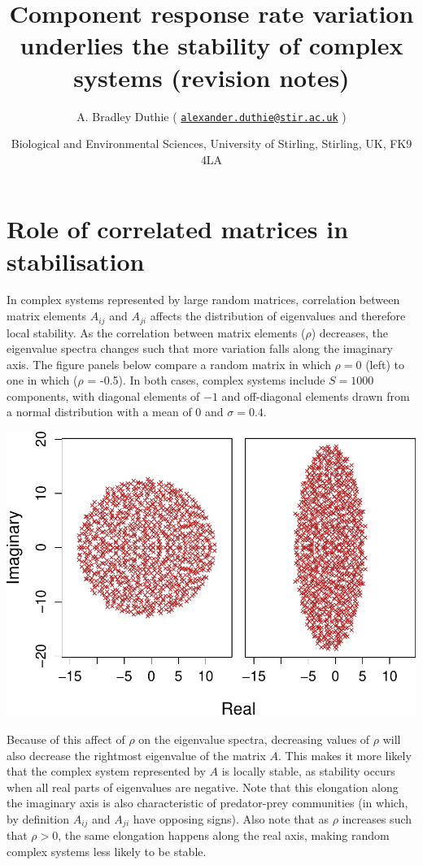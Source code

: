 \documentclass[]{article}
\title{Component response rate variation underlies the stability of complex
systems (revision notes)}
\author{A. Bradley Duthie (
\href{mailto:alexander.duthie@stir.ac.uk}{\nolinkurl{alexander.duthie@stir.ac.uk}}
)}
\date{Biological and Environmental Sciences, University of Stirling, Stirling,
UK, FK9 4LA}
\begin{document}
\maketitle

\hypertarget{role-of-correlated-matrices-in-stabilisation}{%
\section{Role of correlated matrices in
stabilisation}\label{role-of-correlated-matrices-in-stabilisation}}

In complex systems represented by large random matrices, correlation
between matrix elements \(A_{ij}\) and \(A_{ji}\) affects the
distribution of eigenvalues and therefore local stability. As the
correlation between matrix elements (\(\rho\)) decreases, the eigenvalue
spectra changes such that more variation falls along the imaginary axis.
The figure panels below compare a random matrix in which \(\rho = 0\)
(left) to one in which (\(\rho\) = -0.5). In both cases, complex systems
include \(S = 1000\) components, with diagonal elements of \(-1\) and
off-diagonal elements drawn from a normal distribution with a mean of
\(0\) and \(\sigma = 0.4\).

\includegraphics{revision_notes_files/figure-latex/unnamed-chunk-2-1.pdf}

Because of this affect of \(\rho\) on the eigenvalue spectra, decreasing
values of \(\rho\) will also decrease the rightmost eigenvalue of the
matrix \(A\). This makes it more likely that the complex system
represented by \(A\) is locally stable, as stability occurs when all
real parts of eigenvalues are negative. Note that this elongation along
the imaginary axis is also characteristic of predator-prey communities
(in which, by definition \(A_{ij}\) and \(A_{ji}\) have opposing signs).
Also note that as \(\rho\) increases such that \(\rho > 0\), the same
elongation happens along the real axis, making random complex systems
less likely to be stable.
\end{document}
